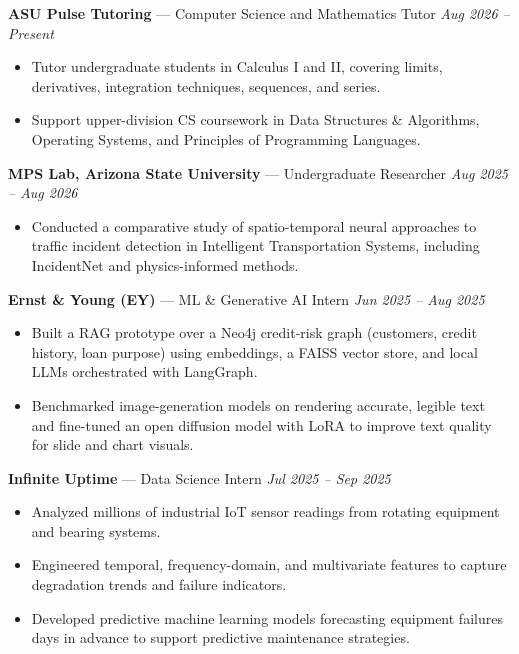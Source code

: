\documentclass[a4paper,8pt]{extarticle}
\begin{document}
\noindent
\textbf{ASU Pulse Tutoring} --- Computer Science and Mathematics Tutor
\hfill \textit{Aug 2026 -- Present}

\begin{itemize}
\item Tutor undergraduate students in Calculus I and II, covering limits, derivatives, integration techniques, sequences, and series.
\item Support upper-division CS coursework in Data Structures \& Algorithms, Operating Systems, and Principles of Programming Languages.
\end{itemize}

\noindent
\textbf{MPS Lab, Arizona State University} --- Undergraduate Researcher
\hfill \textit{Aug 2025 -- Aug 2026}

\begin{itemize}
\item Conducted a comparative study of spatio-temporal neural approaches to traffic incident detection in Intelligent Transportation Systems, including IncidentNet and physics-informed methods.
\end{itemize}

\noindent
\textbf{Ernst \& Young (EY)} --- ML \& Generative AI Intern
\hfill \textit{Jun 2025 -- Aug 2025}

\begin{itemize}
\item Built a RAG prototype over a Neo4j credit-risk graph (customers, credit history, loan purpose) using embeddings, a FAISS vector store, and local LLMs orchestrated with LangGraph.
\item Benchmarked image-generation models on rendering accurate, legible text and fine-tuned an open diffusion model with LoRA to improve text quality for slide and chart visuals.
\end{itemize}

\noindent
\textbf{Infinite Uptime} --- Data Science Intern
\hfill \textit{Jul 2025 -- Sep 2025}

\begin{itemize}
\item Analyzed millions of industrial IoT sensor readings from rotating equipment and bearing systems.
\item Engineered temporal, frequency-domain, and multivariate features to capture degradation trends and failure indicators.
\item Developed predictive machine learning models forecasting equipment failures days in advance to support predictive maintenance strategies.
\end{itemize}
\end{document}
